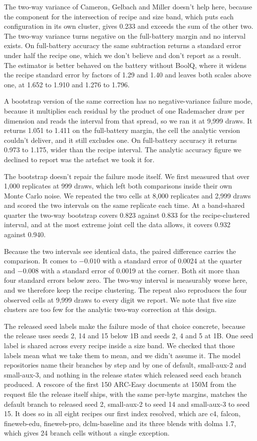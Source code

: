 The two-way variance of Cameron, Gelbach and Miller doesn't help here, because the component for the intersection of recipe and size band, which puts each configuration in its own cluster, gives 0.233 and exceeds the sum of the other two. The two-way variance turns negative on the full-battery margin and no interval exists. On full-battery accuracy the same subtraction returns a standard error under half the recipe one, which we don't believe and don't report as a result. The estimator is better behaved on the battery without BoolQ, where it widens the recipe standard error by factors of 1.29 and 1.40 and leaves both scales above one, at 1.652 to 1.910 and 1.276 to 1.796.

A bootstrap version of the same correction has no negative-variance failure mode, because it multiplies each residual by the product of one Rademacher draw per dimension and reads the interval from that spread, so we ran it at 9,999 draws. It returns 1.051 to 1.411 on the full-battery margin, the cell the analytic version couldn't deliver, and it still excludes one. On full-battery accuracy it returns 0.973 to 1.175, wider than the recipe interval. The analytic accuracy figure we declined to report was the artefact we took it for.

The bootstrap doesn't repair the failure mode itself. We first measured that over 1,000 replicates at 999 draws, which left both comparisons inside their own Monte Carlo noise. We repeated the two cells at 8,000 replicates and 2,999 draws and scored the two intervals on the same replicate each time. At a band-shared quarter the two-way bootstrap covers 0.823 against 0.833 for the recipe-clustered interval, and at the most extreme joint cell the data allows, it covers 0.932 against 0.940.

Because the two intervals see identical data, the paired difference carries the comparison. It comes to $-0.010$ with a standard error of 0.0024 at the quarter and $-0.008$ with a standard error of 0.0019 at the corner. Both sit more than four standard errors below zero. The two-way interval is measurably worse here, and we therefore keep the recipe clustering. The repeat also reproduces the four observed cells at 9,999 draws to every digit we report. We note that five size clusters are too few for the analytic two-way correction at this design.

The released seed labels make the failure mode of that choice concrete, because the release uses seeds 2, 14 and 15 below 1B and seeds 2, 4 and 5 at 1B. One seed label is shared across every recipe inside a size band. We checked that those labels mean what we take them to mean, and we didn't assume it. The model repositories name their branches by step and by one of default, small-aux-2 and small-aux-3, and nothing in the release states which released seed each branch produced. A rescore of the first 150 ARC-Easy documents at 150M from the request file the release itself ships, with the same per-byte margins, matches the default branch to released seed 2, small-aux-2 to seed 14 and small-aux-3 to seed 15. It does so in all eight recipes our first index resolved, which are c4, falcon, fineweb-edu, fineweb-pro, dclm-baseline and its three blends with dolma 1.7, which gives 24 branch cells without a single exception.

